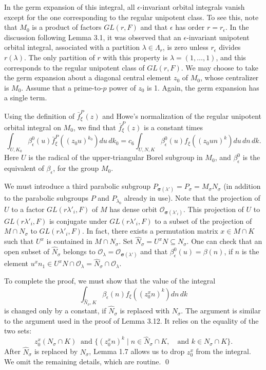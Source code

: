 \documentclass{amsart}
\begin{document}
In the germ expansion of this integral, all
$\epsilon$-invariant orbital integrals vanish except for the one
corresponding to the regular unipotent  class.  To see this, note that $M_0$
is a product of factors $GL(r,F)$ and that $\epsilon$ has order
$r=r_\epsilon$.  In the discussion following Lemma 3.1, it was observed
that an $\epsilon$-invariant unipotent orbital integral, 
associated with a partition
$\lambda\in\Lambda_r$, is zero unless $r_\epsilon$ divides $r(\lambda)$.
The only partition of $r$ with this property is $\lambda=(1,\ldots,1)$,
and this corresponds to the regular unipotent class of $GL(r,F)$.
We may choose to take the germ expansion about a diagonal central element $z_0$
of $M_0$, whose centralizer is $M_0$.  Assume that
a prime-to-$p$ power of $z_0$ is 1.  Again, the germ expansion has a single term.

Using the definition of $\bar f_\xi^P(z)$ and Howe's normalization of
the regular unipotent orbital integral on $M_0$, we find that
$\bar f_\xi^P(z)$ is a constant times
$$\int_{U,K_0} \beta^0_\epsilon(u)\bar f_\xi^P((z_0u)^{k_0}) du\,dk_0 =
	c_6\int_{U,N,K} \beta_\epsilon^0(u) f_\xi((z_0un)^k) du\,dn\,dk.$$
Here $U$ is the radical of the upper-triangular Borel subgroup
in $M_0$, and $\beta_\epsilon^0$ is the equivalent of $\beta_\epsilon$,
for the group $M_0$.

We must introduce a third parabolic subgroup $P_{\pmb\sigma(\lambda')} =
P_\sigma=M_\sigma N_\sigma$ (in addition to the parabolic subgroups
$P$ and $P_{\lambda_0}$ already in use).  Note that the
projection of $U$ to a factor $GL(r\lambda'_i,F)$ of $M$ has
dense orbit ${\mathcal O}_{\pmb\sigma(\lambda'_i)}$.  This projection
of $U$ to $GL(r\lambda'_i,F)$ is conjugate under $GL(r\lambda'_i,F)$ to
a subset of the projection of $M\cap N_\sigma$ to $GL(r\lambda'_i,F)$.  
In fact,
there exists a permutation matrix $x\in M\cap K$ such that $U^x$ is contained
in $M\cap N_\sigma$.  Set
$\hat N_\sigma = U^xN\subseteq N_\sigma$.  One can check that
an open subset of $\hat N_\sigma$ belongs to ${\mathcal O}_\lambda = {\mathcal O}_{\pmb\sigma(\lambda')}$
and that $\beta^0_\epsilon(u) = \beta(n)$, if $n$ is the element
$u^xn_1\in U^xN \cap
{\mathcal O}_{\lambda} = \hat N_\sigma\cap {\mathcal O}_\lambda$.

To complete the proof, we must show that the value of the integral
$$\int_{\hat N_{\sigma},K} \beta_\epsilon(n) f_\xi((z_0^xn)^k) dn\,dk$$
is changed only by a constant, if $\hat N_\sigma$ is replaced with
$N_\sigma$.  The argument is similar to the argument used in the
proof of Lemma 3.12.  It relies on the equality of the two sets:
$$z_0^x(N_\sigma\cap K)\ \text{ and } \{(z_0^xn)^k\mid n\in \hat N_\sigma\cap K,
\quad \text{and } k\in N_\sigma\cap K\}.$$
After $\hat N_\sigma$ is replaced by $N_\sigma$, Lemma 1.7 allows us to drop
$z_0^x$ from the integral.  We omit the remaining details, which are routine.
\qed\finishpproclaim
\end{document}
